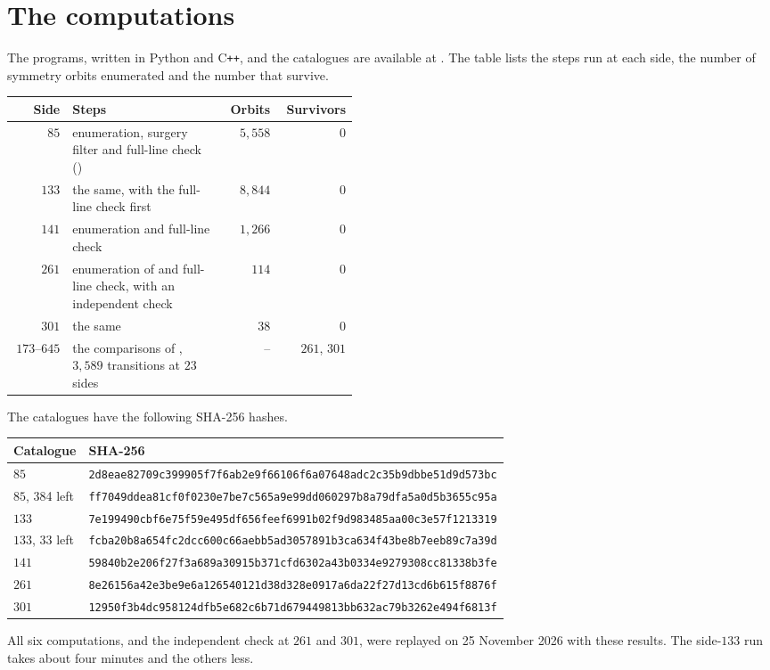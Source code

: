 \documentclass[11pt,colorlinks]{charlie}
\begin{document}
\section{The computations}\label{sec:computation}
The programs, written in Python and C\texttt{++}, and the catalogues are available at \coderepo. The table lists the steps run at each side, the number of symmetry orbits enumerated and the number that survive.

\begin{center}\small
\begin{tabular}{@{}rL{0.45\linewidth}rr@{}}
\toprule
Side & Steps & Orbits & Survivors \\
\midrule
$85$ & enumeration, surgery filter and full-line check () & $5{,}558$ & $0$ \\
$133$ & the same, with the full-line check first & $8{,}844$ & $0$ \\
$141$ & enumeration and full-line check & $1{,}266$ & $0$ \\
$261$ & enumeration of  and full-line check, with an independent check & $114$ & $0$ \\
$301$ & the same & $38$ & $0$ \\
$173$--$645$ & the comparisons of , $3{,}589$ transitions at $23$ sides & -- & $261$, $301$ \\
\bottomrule
\end{tabular}
\end{center}

The catalogues have the following SHA-256 hashes.
\begin{center}\scriptsize
\setlength{\tabcolsep}{4pt}\begin{tabular}{@{}ll@{}}
\toprule
Catalogue & SHA-256\\
\midrule
$85$ & \texttt{2d8eae82709c399905f7f6ab2e9f66106f6a07648adc2c35b9dbbe51d9d573bc}\\
$85$, 384 left & \texttt{ff7049ddea81cf0f0230e7be7c565a9e99dd060297b8a79dfa5a0d5b3655c95a}\\
$133$ & \texttt{7e199490cbf6e75f59e495df656feef6991b02f9d983485aa00c3e57f1213319}\\
$133$, 33 left & \texttt{fcba20b8a654fc2dcc600c66aebb5ad3057891b3ca634f43be8b7eeb89c7a39d}\\
$141$ & \texttt{59840b2e206f27f3a689a30915b371cfd6302a43b0334e9279308cc81338b3fe}\\
$261$ & \texttt{8e26156a42e3be9e6a126540121d38d328e0917a6da22f27d13cd6b615f8876f}\\
$301$ & \texttt{12950f3b4dc958124dfb5e682c6b71d679449813bb632ac79b3262e494f6813f}\\
\bottomrule
\end{tabular}
\end{center}
All six computations, and the independent check at $261$ and $301$, were replayed on 25 November 2026 with these results. The side-$133$ run takes about four minutes and the others less.
\end{document}
